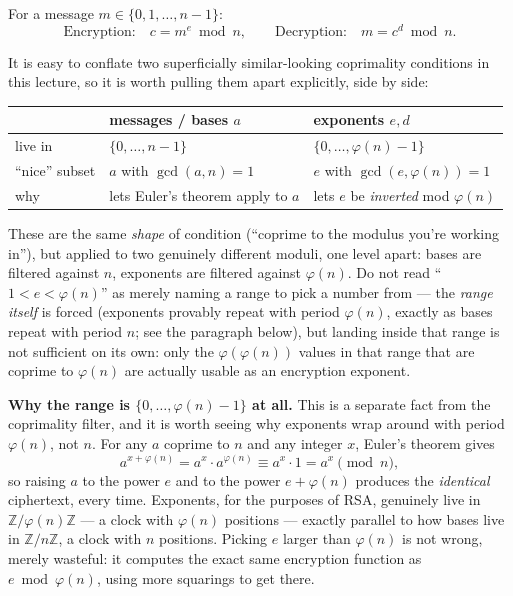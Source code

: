 \begin{definition}
For a message $m \in \{0, 1, \dots, n-1\}$:
\[
\text{Encryption:} \quad c = m^{e} \bmod n, \qquad \text{Decryption:} \quad m = c^{d} \bmod n.
\]
\end{definition}

\begin{remark}[Why $\gcd(e,\varphi(n))=1$ is required — and why this is a completely different condition from $\gcd(a,n)=1$]\label{rem:exponent-range}
It is easy to conflate two superficially similar-looking coprimality conditions in this lecture, so it is worth pulling them apart explicitly, side by side:
\begin{center}
\begin{tabular}{lll}
\toprule
& \textbf{messages / bases} $a$ & \textbf{exponents} $e,d$\\
\midrule
live in & $\{0,\dots,n-1\}$ & $\{0,\dots,\varphi(n)-1\}$\\
``nice'' subset & $a$ with $\gcd(a,n)=1$ & $e$ with $\gcd(e,\varphi(n))=1$\\
why & lets Euler's theorem apply to $a$ & lets $e$ be \emph{inverted} mod $\varphi(n)$\\
\bottomrule
\end{tabular}
\end{center}
These are the same \emph{shape} of condition (``coprime to the modulus you're working in''), but applied to two genuinely different moduli, one level apart: bases are filtered against $n$, exponents are filtered against $\varphi(n)$. Do not read ``$1<e<\varphi(n)$'' as merely naming a range to pick a number from — the \emph{range itself} is forced (exponents provably repeat with period $\varphi(n)$, exactly as bases repeat with period $n$; see the paragraph below), but landing inside that range is not sufficient on its own: only the $\varphi(\varphi(n))$ values in that range that are coprime to $\varphi(n)$ are actually usable as an encryption exponent.

\medskip\noindent\textbf{Why the range is $\{0,\dots,\varphi(n)-1\}$ at all.} This is a separate fact from the coprimality filter, and it is worth seeing why exponents wrap around with period $\varphi(n)$, not $n$. For any $a$ coprime to $n$ and any integer $x$, Euler's theorem gives
\[
a^{x+\varphi(n)} = a^x \cdot a^{\varphi(n)} \equiv a^x \cdot 1 = a^x \pmod n,
\]
so raising $a$ to the power $e$ and to the power $e+\varphi(n)$ produces the \emph{identical} ciphertext, every time. Exponents, for the purposes of RSA, genuinely live in $\mathbb{Z}/\varphi(n)\mathbb{Z}$ — a clock with $\varphi(n)$ positions — exactly parallel to how bases live in $\mathbb{Z}/n\mathbb{Z}$, a clock with $n$ positions. Picking $e$ larger than $\varphi(n)$ is not wrong, merely wasteful: it computes the exact same encryption function as $e \bmod \varphi(n)$, using more squarings to get there.


\end{remark}

